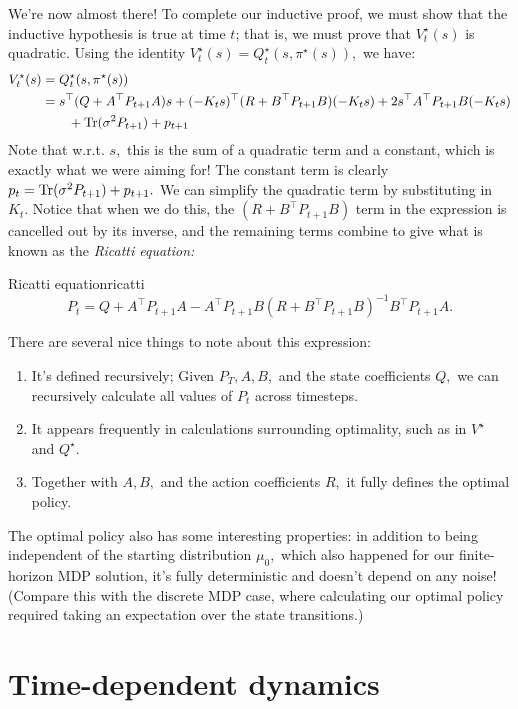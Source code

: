 \documentclass[../main/main]{subfiles}
\begin{document}
We're now almost there! To complete our inductive proof, we must show that the
inductive hypothesis is true at time $t$; that is, we must prove that
$V^\star_t(s)$ is quadratic.
Using the identity $V^\star_t(s) = Q^\star_t(s, \pi^\star(s)),$ we have: \begin{align*}
    V^\star_t(s) &= Q^\star_t(s, \pi^\star(s)) \\
    &= s^\top (Q + A^\top P_{t+1} A) s + (-K_t s)^\top (R + B^\top P_{t+1} B) (-K_t s)
    + 2s^\top A^\top P_{t+1} B (-K_t s) \\
        &\qquad + \operatorname*{\textrm{Tr}}(\sigma^2 P_{t+1}) + p_{t+1}
\end{align*}
Note that w.r.t. $s,$ this is the sum of a quadratic term and a constant,
which is exactly what we were aiming for!
The constant term is clearly $p_t = \operatorname*{\textrm{Tr}}(\sigma^2 P_{t+1}) + p_{t+1}.$
We can simplify the quadratic term by substituting in $K_t.$
Notice that when we do this, the $(R+B^\top P_{t+1} B)$ term in
the expression is cancelled out by its inverse, and the remaining terms combine to give
what is known as the \emph{Ricatti equation:}
\begin{theorem}{Ricatti equation}{ricatti}
    \[
        P_t = Q + A^\top P_{t+1} A - A^\top P_{t+1} B (R + B^\top P_{t+1} B)^{-1} B^\top P_{t+1} A.
    \]
\end{theorem}
There are several nice things to note about this expression:
\begin{enumerate}
    \item It's defined recursively; Given $P_T, A, B,$ and the state coefficients $Q,$ we can
    recursively calculate all values of $P_t$ across timesteps.
    \item It appears frequently in calculations surrounding optimality,
    such as in $V^\star$ and $Q^\star$.
    \item Together with $A, B,$ and the action coefficients $R,$ it fully defines the optimal policy.
\end{enumerate}
The optimal policy also has some interesting properties: in addition to being
independent of the starting distribution $\mu_0,$ which also happened for our
finite-horizon MDP solution, it's fully deterministic and doesn't depend on any noise!
(Compare this with the discrete MDP case, where calculating our optimal policy
required taking an expectation over the state transitions.)


\section{Time-dependent dynamics} \label{sec:time_dep}
\end{document}
